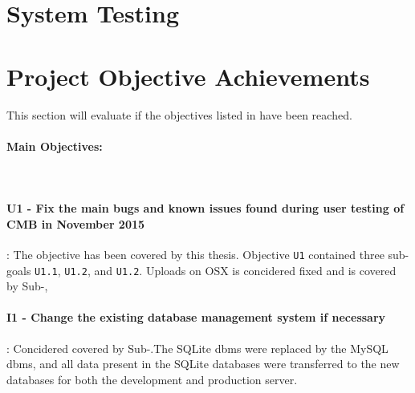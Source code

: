 \section{System Testing}

\section{Project Objective Achievements}
This section will evaluate if the objectives listed in  have been reached. \\

\paragraph*{Main Objectives:} \hfill \\

\paragraph*{U1 - Fix the main bugs and known issues found during user testing of CMB in November 2015}: The objective has been covered by this thesis. Objective \texttt{U1} contained three sub-goals \texttt{U1.1}, \texttt{U1.2}, and \texttt{U1.2}. Uploads on OSX is concidered fixed and is covered by Sub-\Cref{},

\paragraph*{I1 - Change the existing database management system if necessary}: Concidered covered by Sub-.The SQLite \gls{dbms} were replaced by the MySQL \gls{dbms}, and all data present in the SQLite databases were transferred to the new databases for both the development and production server. 
